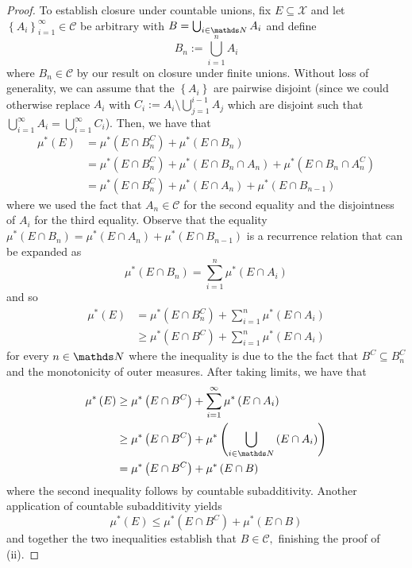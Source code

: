 \begin{proof}
To establish closure under countable unions, fix $E\subseteq\mathcal{X}$
and let $\left\{ A_{i}\right\} _{i=1}^{\infty}\in\mathcal{C}$ be
arbitrary with $B=\bigcup_{i\in\N}A_{i}$ and define
\[
B_{n}:=\bigcup_{i=1}^{n}A_{i}
\]
where $B_{n}\in\mathcal{C}$ by our result on closure under finite
unions. Without loss of generality, we can assume that the $\left\{ A_{i}\right\} $
are pairwise disjoint (since we could otherwise replace $A_{i}$ with
$C_{i}:=A_{i}\setminus\bigcup_{j=1}^{i-1}A_{j}$ which are disjoint
such that $\bigcup_{i=1}^{\infty}A_{i}=\bigcup_{i=1}^{\infty}C_{i}$).
Then, we have that
\begin{align*}
\mu^{*}\left(E\right) & =\mu^{*}\left(E\cap B_{n}^{C}\right)+\mu^{*}\left(E\cap B_{n}\right)\\
 & =\mu^{*}\left(E\cap B_{n}^{C}\right)+\mu^{*}\left(E\cap B_{n}\cap A_{n}\right)+\mu^{*}\left(E\cap B_{n}\cap A_{n}^{C}\right)\\
 & =\mu^{*}\left(E\cap B_{n}^{C}\right)+\mu^{*}\left(E\cap A_{n}\right)+\mu^{*}\left(E\cap B_{n-1}\right)
\end{align*}
where we used the fact that $A_{n}\in\mathcal{C}$ for the second
equality and the disjointness of $A_{i}$ for the third equality.
Observe that the equality $\mu^{*}\left(E\cap B_{n}\right)=\mu^{*}\left(E\cap A_{n}\right)+\mu^{*}\left(E\cap B_{n-1}\right)$
is a recurrence relation that can be expanded as
\[
\mu^{*}\left(E\cap B_{n}\right)=\sum_{i=1}^{n}\mu^{*}\left(E\cap A_{i}\right)
\]
and so 
\begin{align*}
\mu^{*}\left(E\right) & =\mu^{*}\left(E\cap B_{n}^{C}\right)+\sum_{i=1}^{n}\mu^{*}\left(E\cap A_{i}\right)\\
 & \geq\mu^{*}\left(E\cap B^{C}\right)+\sum_{i=1}^{n}\mu^{*}\left(E\cap A_{i}\right)
\end{align*}
for every $n\in\N$ where the inequality is due to the the fact that
$B^{C}\subseteq B_{n}^{C}$ and the monotonicity of outer measures.
After taking limits, we have that
\begin{align*}
\mu^{*}\left(E\right) & \geq\mu^{*}\left(E\cap B^{C}\right)+\sum_{i=1}^{\infty}\mu^{*}\left(E\cap A_{i}\right)\\
 & \geq\mu^{*}\left(E\cap B^{C}\right)+\mu^{*}\left(\bigcup_{i\in\N}\left(E\cap A_{i}\right)\right)\\
 & =\mu^{*}\left(E\cap B^{C}\right)+\mu^{*}\left(E\cap B\right)
\end{align*}
where the second inequality follows by countable subadditivity. Another
application of countable subadditivity yields
\[
\mu^{*}\left(E\right)\leq\mu^{*}\left(E\cap B^{C}\right)+\mu^{*}\left(E\cap B\right)
\]
and together the two inequalities establish that $B\in\mathcal{C},$
finishing the proof of (ii).


\end{proof}
